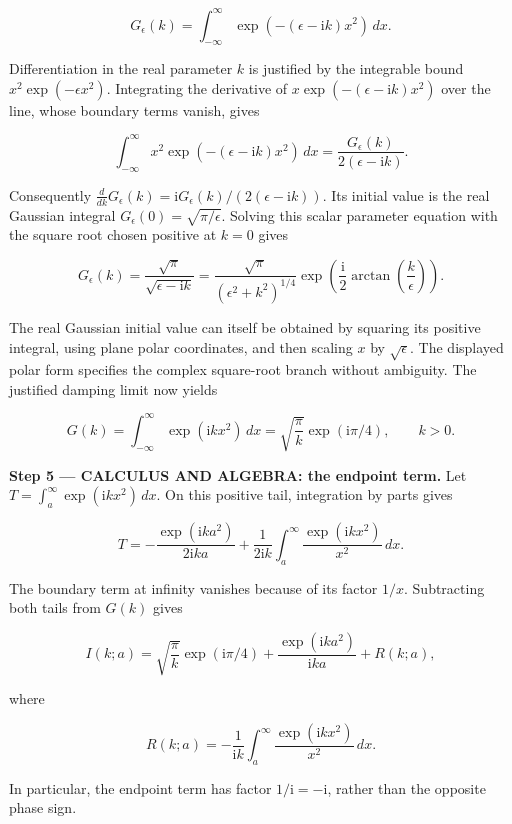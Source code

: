 \documentclass[11pt,oneside,openany]{book}
\begin{document}
\[
G_\epsilon(k)=\int_{-\infty}^\infty
\exp\left(-\left(\epsilon-\mathrm{i}k\right)x^2\right)\,dx.
\]

Differentiation in the real parameter \(k\) is justified by the integrable bound \(x^2\exp(-\epsilon x^2)\). Integrating the derivative of \(x\exp(- (\epsilon-\mathrm{i}k)x^2)\) over the line, whose boundary terms vanish, gives

\[
\int_{-\infty}^\infty x^2\exp(- (\epsilon-\mathrm{i}k)x^2)\,dx
=\frac{G_\epsilon(k)}{2(\epsilon-\mathrm{i}k)}.
\]

Consequently \(\frac{d}{dk}G_\epsilon(k)=\mathrm{i}G_\epsilon(k)/(2(\epsilon-\mathrm{i}k))\). Its initial value is the real Gaussian integral \(G_\epsilon(0)=\sqrt{\pi/\epsilon}\). Solving this scalar parameter equation with the square root chosen positive at \(k=0\) gives

\[
G_\epsilon(k)=\frac{\sqrt\pi}{\sqrt{\epsilon-\mathrm{i}k}}
=\frac{\sqrt\pi}{(\epsilon^2+k^2)^{1/4}}
\exp\left(\frac{\mathrm{i}}2\arctan\left(\frac k\epsilon\right)\right).
\]

The real Gaussian initial value can itself be obtained by squaring its positive integral, using plane polar coordinates, and then scaling \(x\) by \(\sqrt\epsilon\). The displayed polar form specifies the complex square-root branch without ambiguity. The justified damping limit now yields

\[
G(k)=\int_{-\infty}^\infty\exp(\mathrm{i}kx^2)\,dx
=\sqrt{\frac\pi k}\exp(\mathrm{i}\pi/4),\qquad k>0.
\]

\textbf{Step 5 --- CALCULUS AND ALGEBRA: the endpoint term.} Let \(T=\int_a^\infty\exp(\mathrm{i}kx^2)\,dx\). On this positive tail, integration by parts gives

\[
T=-\frac{\exp(\mathrm{i}ka^2)}{2\mathrm{i}ka}
+\frac1{2\mathrm{i}k}\int_a^\infty\frac{\exp(\mathrm{i}kx^2)}{x^2}\,dx.
\]

The boundary term at infinity vanishes because of its factor \(1/x\). Subtracting both tails from \(G(k)\) gives

\[
I(k;a)=\sqrt{\frac\pi k}\exp(\mathrm{i}\pi/4)
+\frac{\exp(\mathrm{i}ka^2)}{\mathrm{i}ka}+R(k;a),
\]

where

\[
R(k;a)=-\frac1{\mathrm{i}k}\int_a^\infty\frac{\exp(\mathrm{i}kx^2)}{x^2}\,dx.
\]

In particular, the endpoint term has factor \(1/\mathrm{i}=-\mathrm{i}\), rather than the opposite phase sign.
\end{document}
